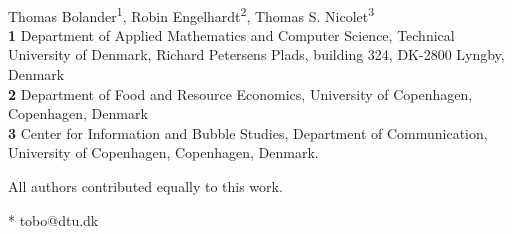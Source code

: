 \documentclass[10pt,letterpaper]{article}
\begin{document}
\vspace*{0.2in}

\begin{flushleft}
{\Large
\textbf{} %
}
\newline
\\
Thomas Bolander\textsuperscript{1\Yinyang*},
Robin Engelhardt\textsuperscript{2\Yinyang},
Thomas S. Nicolet\textsuperscript{3\Yinyang}
\\
\bigskip
\textbf{1} Department of Applied Mathematics and Computer Science, Technical University of Denmark, Richard Petersens Plads, building 324, DK-2800 Lyngby, Denmark
\\
\textbf{2} 
Department of Food and Resource Economics, University of Copenhagen, Copenhagen, Denmark
\\
\textbf{3}
Center for Information and Bubble Studies, Department of Communication, University of Copenhagen, Copenhagen, Denmark.
\\
\bigskip

% 
%
\Yinyang All authors contributed equally to this work.





* tobo@dtu.dk

\end{flushleft}
\end{document}
